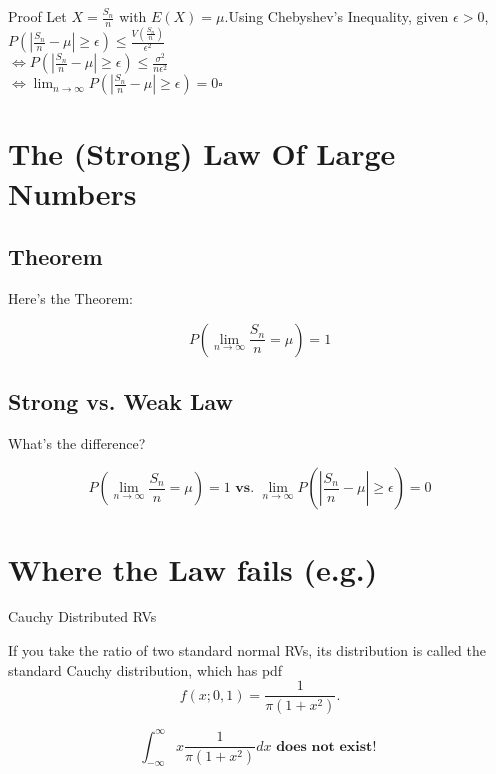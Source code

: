 \documentclass[9pt]{beamer}
\begin{document}
\begin{frame}{Proof}
\pause
Let $X=\frac{S_{n}}{n}$ with $E(X)=\mu$.\pause Using Chebyshev's Inequality, given $\epsilon>0$,\\

$P\left( \left| \frac{S_{n}}{n} -\mu \right|\geq \epsilon \right)\leq \frac{V\left( \frac{S_{n}}{n} \right)}{\epsilon^{2}}$\\ \pause
$\Leftrightarrow P\left( \left| \frac{S_{n}}{n} -\mu \right|\geq \epsilon \right)\leq \frac{\sigma^{2}}{n\epsilon^{2}}$ \\ \pause
$\Leftrightarrow \lim_{n\rightarrow \infty}P\left( \left| \frac{S_{n}}{n} -\mu \right|\geq \epsilon \right)=0\square$


\end{frame}    

\section{The (Strong) Law Of Large Numbers}
\subsection{Theorem}

\begin{frame}{Here's the Theorem:}

\[P\left( \lim_{n\rightarrow \infty}\frac{S_{n}}{n}=\mu \right) = 1\]

\end{frame}

\subsection{Strong vs. Weak Law}

\begin{frame}{What's the difference?}

\[P\left( \lim_{n\rightarrow \infty}\frac{S_{n}}{n}=\mu \right) = 1 \textbf{ vs. } \lim_{n\rightarrow \infty }P\left( \left| \frac{S_{n}}{n}-\mu \right|\geq \epsilon \right) =0\]

\end{frame}

\section{Where the Law fails (e.g.)}

\begin{frame}{Cauchy Distributed RVs}

If you take the ratio of two standard normal RVs, its distribution is called the standard Cauchy distribution, which has pdf
\[f(x;0,1)=\frac{1}{\pi(1+x^{2})}.\]

\[\int_{-\infty}^{\infty}x\frac{1}{\pi(1+x^{2})}dx \textbf{  does not exist! }\]
\end{frame}
\end{document}
